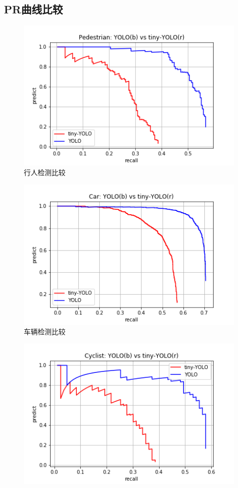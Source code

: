 {	\subsection{PR曲线比较}
	\begin{figure}[htbp]
	\centering
	\includegraphics[width=5in]{images/pedestrianPR.png}
	\caption{行人检测比较}
	\label{pedestrianPR}
	\end{figure}
	\begin{figure}[htbp]
	\centering
	\includegraphics[width=5in]{images/carPR.png}
	\caption{车辆检测比较}
	\label{carPR}
	\end{figure}
	\begin{figure}[htbp]
	\centering
	\includegraphics[width=5in]{images/cyclistPR.png}

\end{figure}}
